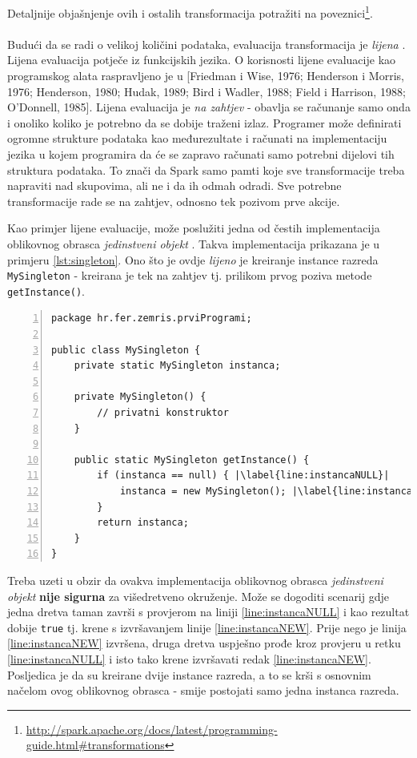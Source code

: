 \documentclass[times, utf8, zavrsni, numeric]{fer}
\begin{document}
Detaljnije objašnjenje ovih i ostalih transformacija potražiti na poveznici\footnote{\url{http://spark.apache.org/docs/latest/programming-guide.html#transformations}}.
\\
\\
Budući da se radi o velikoj količini podataka, evaluacija transformacija je \emph{lijena} . Lijena evaluacija potječe iz funkcijskih jezika. O korisnosti lijene evaluacije kao programskog alata raspravljeno je u [Friedman i Wise, 1976; Henderson i Morris, 1976; Henderson, 1980; Hudak, 1989; Bird i Wadler, 1988; Field i Harrison, 1988; O'Donnell, 1985]. Lijena evaluacija je \emph{na zahtjev} - obavlja se računanje samo onda i onoliko koliko je potrebno da se dobije traženi izlaz. Programer može definirati ogromne strukture podataka kao međurezultate i računati na implementaciju jezika u kojem programira da će se zapravo računati samo potrebni dijelovi tih struktura podataka. To znači da Spark samo pamti koje sve transformacije treba napraviti nad skupovima, ali ne i da ih odmah odradi. Sve potrebne transformacije rade se na zahtjev, odnosno tek pozivom prve akcije. 

Kao primjer lijene evaluacije, može poslužiti jedna od čestih implementacija oblikovnog obrasca \emph{jedinstveni objekt} . Takva implementacija prikazana je u primjeru \ref{lst:singleton}. Ono što je ovdje \emph{lijeno} je kreiranje instance razreda \texttt{MySingleton} - kreirana je tek na zahtjev tj. prilikom prvog poziva metode \texttt{getInstance()}.

\vspace{5mm}
\begin{lstlisting}[numbers=left, label={lst:singleton}, caption={Lijena evaluacija u oblikovnom obrascu \emph{jedinstveni objekt}.}, escapechar=|]
package hr.fer.zemris.prviProgrami;

public class MySingleton {
	private static MySingleton instanca;

	private MySingleton() {
		// privatni konstruktor
	}

	public static MySingleton getInstance() {
		if (instanca == null) { |\label{line:instancaNULL}|
			instanca = new MySingleton(); |\label{line:instancaNEW}|
		}
		return instanca;
	}
}
\end{lstlisting}

Treba uzeti u obzir da ovakva implementacija oblikovnog obrasca \emph{jedinstveni objekt} \textbf{nije sigurna} za višedretveno okruženje. Može se dogoditi scenarij gdje jedna dretva taman završi s provjerom na liniji \ref{line:instancaNULL} i kao rezultat dobije \texttt{true} tj. krene s izvršavanjem linije \ref{line:instancaNEW}. Prije nego je linija \ref{line:instancaNEW} izvršena, druga dretva uspješno prođe kroz provjeru u retku \ref{line:instancaNULL} i isto tako krene izvršavati redak \ref{line:instancaNEW}. Posljedica je da su kreirane dvije instance razreda, a to se krši s osnovnim načelom ovog oblikovnog obrasca - smije postojati samo jedna instanca razreda.
\end{document}

